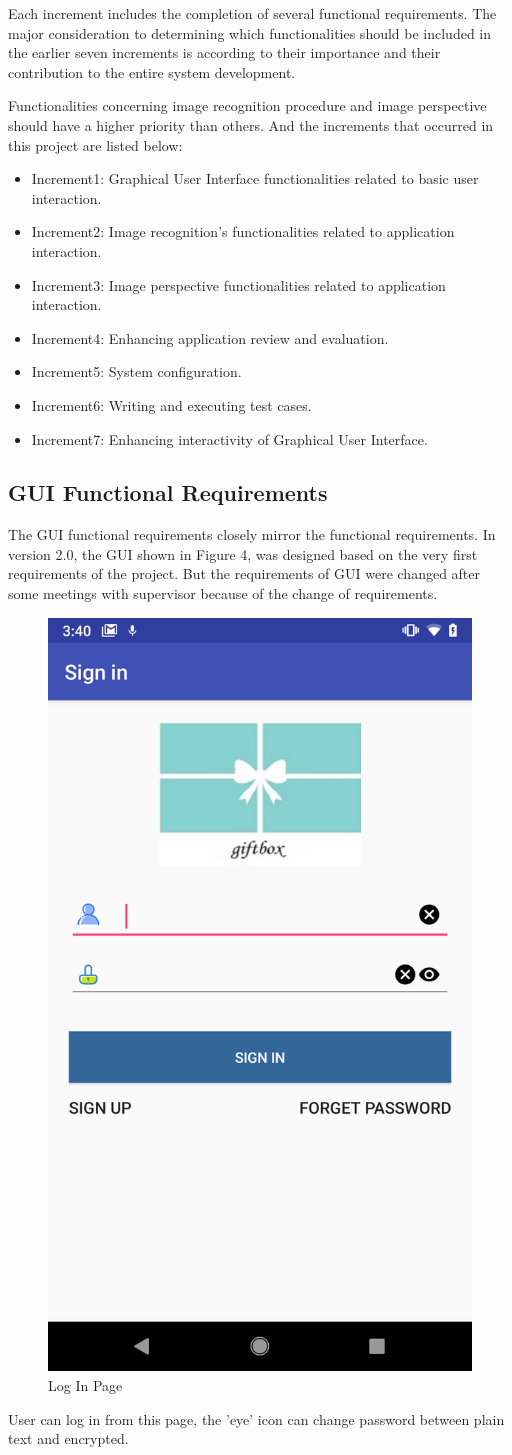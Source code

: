 \par Each increment includes the completion of several functional requirements. The major consideration to determining which functionalities should be included in the earlier seven increments is according to their importance and their contribution to the entire system development.
\par Functionalities concerning image recognition procedure  and image perspective should have a higher priority than others. And the increments that occurred in this project are listed below:
\begin{itemize}
\item Increment1: Graphical User Interface functionalities related to basic user interaction.
\item Increment2: Image recognition's functionalities related to application interaction.
\item Increment3: Image perspective functionalities related to application interaction.
\item Increment4: Enhancing application review and evaluation.
\item Increment5: System configuration.
\item Increment6: Writing and executing test cases.
\item Increment7: Enhancing interactivity of Graphical User Interface.
\end{itemize}

\subsection{GUI Functional Requirements}
The GUI functional requirements closely mirror the functional requirements. In version 2.0, the GUI shown in Figure 4, was designed based on the very first requirements of the project. But the requirements of GUI were changed after some meetings with supervisor because of the change of requirements.
\begin{figure}[H]
\centering
\includegraphics[width=.25\textwidth]{section02/assets/SignIn.png}
\caption[Short Caption 2]{\label{SignIn}Log In Page}
\end{figure}
\par User can log in from this page, the 'eye' icon can change password between plain text and encrypted.

